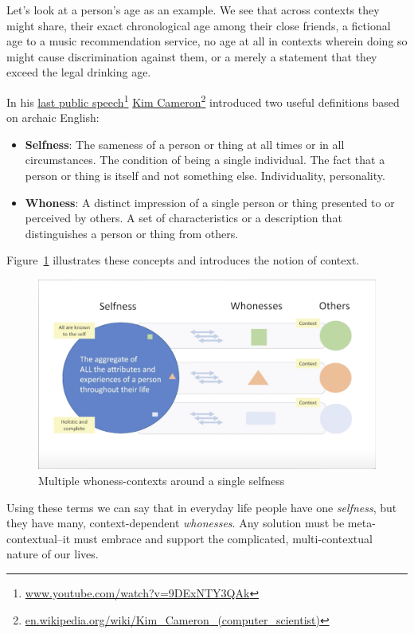 \documentclass[11pt, oneside]{article}   	%
\newcommand{\hyperfootnote}[1][]{\def\ArgI{{#1}}\hyperfootnoteRelay}
\newcommand\hyperfootnoteRelay[2][]{\href{#1#2}{\ArgI}\footnote{\href{#1#2}{#2}}}
\begin{document}
Let's look at a person's age as an example. We see that across contexts they might share, their exact chronological age among their close friends, a fictional age to a music recommendation service, no age at all in contexts wherein doing so might cause discrimination against them, or a merely a statement that they exceed the legal drinking age. 

In his \hyperfootnote[last public speech][https://]{www.youtube.com/watch?v=9DExNTY3QAk}  
\hyperfootnote[Kim Cameron][https://]{en.wikipedia.org/wiki/Kim\_Cameron\_(computer\_scientist)} introduced two useful definitions based on archaic English:

\begin{itemize}
\item \textbf{Selfness}: The sameness of a person or thing at all times or in all circumstances. The condition of being a single individual. The fact that a person or thing is itself and not something else. Individuality, personality. 
\item \textbf{Whoness}: A distinct impression of a single person or thing presented to or perceived by others. A set of characteristics or a description that distinguishes a person or thing from others. 
\end{itemize}

Figure~\ref{fig:multiple-contexts} illustrates these concepts and introduces the notion of context.

\begin{figure}[htbp]
\includegraphics[width=\textwidth]{./images/selfness-and-whoness-larger.png}
\caption{Multiple whoness-contexts around a single selfness}
\label{fig:multiple-contexts}
\end{figure}

Using these terms we can say that in everyday life people have one \emph{selfness}, but they have many, context-dependent \emph{whonesses}. Any solution must be meta-contextual--it must embrace and support the complicated, multi-contextual nature of our lives.
\end{document}
